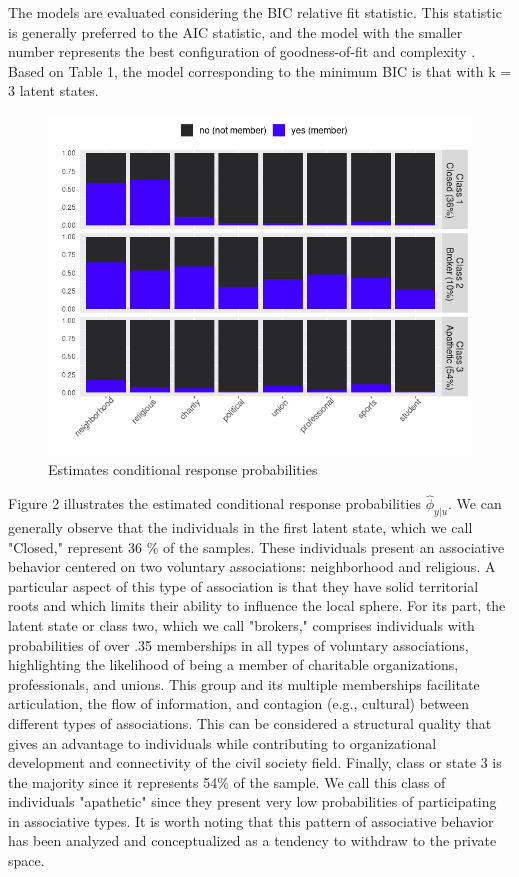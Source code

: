 The models are evaluated considering the BIC relative fit statistic. This statistic is generally preferred to the AIC statistic, and the model with the smaller number represents the best configuration of goodness-of-fit and complexity \parencite{bartolucci_latent_2015}. Based on Table 1, the model corresponding to the minimum BIC is that with k = 3 latent states. 

\begin{figure}[htp]
    \centering
    \includegraphics[width=13cm]{output/plot_latentclass2.png}
    \caption{Estimates conditional response probabilities}
    \label{fig:}
\end{figure}


Figure 2 illustrates the estimated conditional response probabilities \( \widehat{\phi}_{y|u}\). We can generally observe that the individuals in the first latent state, which we call "Closed," represent 36 \% of the samples. These individuals present an associative behavior centered on two voluntary associations: neighborhood and religious. A particular aspect of this type of association is that they have solid territorial roots and which limits their ability to influence the local sphere. For its part, the latent state or class two, which we call "brokers," comprises individuals with probabilities of over .35 memberships in all types of voluntary associations, highlighting the likelihood of being a member of charitable organizations, professionals, and unions. This group and its multiple memberships facilitate articulation, the flow of information, and contagion (e.g., cultural) between different types of associations. This can be considered a structural quality that gives an advantage to individuals while contributing to organizational development and connectivity of the civil society field. Finally, class or state 3 is the majority since it represents 54\% of the sample. We call this class of individuals "apathetic" since they present very low probabilities of participating in associative types. It is worth noting that this pattern of associative behavior has been analyzed and conceptualized as a tendency to withdraw to the private space.


